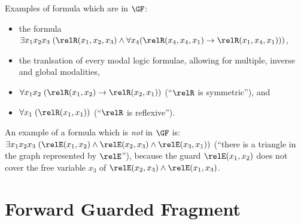 \begin{example}
  Examples of formula which are in $\GF$:
  \begin{itemize}
    \item the formula $\exists{x_{1}x_{2}x_{3}}\; (\relR(x_{1}, x_{2}, x_{3}) \land \forall x_{4}(\relR(x_{4}, x_{4}, x_{1}) \to \relR(x_{1}, x_{4}, x_{1})))$,
    \item the tranlsation of every modal logic formulae, allowing for multiple, inverse and global modalities,
    \item $\forall{x_{1}x_{2}}\; (\relR(x_{1},x_{2}) \to \relR(x_{2},x_{1}))$ (``$\relR$ is symmetric''), and
    \item $\forall{x_{1}}\; (\relR(x_{1},x_{1}))$ (``$\relR$ is reflexive'').
  \end{itemize}
\end{example}
\begin{example}
  An example of a formula which is \emph{not} in $\GF$ is: $\exists{x_{1}x_{2}x_{3}}\; (\relE(x_{1}, x_{2}) \land \relE(x_{2}, x_{3}) \land \relE(x_{3}, x_{1}))$ (``there is a triangle in the graph represented by $\relE$''), because the guard $\relE(x_{1}, x_{2})$ does not cover the free variable $x_{3}$ of $\relE(x_{2},x_{3}) \land \relE(x_{1}, x_{3})$.
\end{example}

\section{Forward Guarded Fragment}

